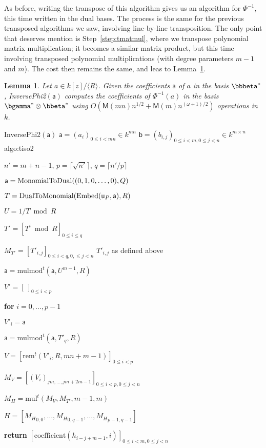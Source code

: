\documentclass{sig-alternate}
\def\M {\ensuremath{\mathsf{M}}}
\def\va {\ensuremath{\mathsf{a}}}
\def\vy {\ensuremath{\mathsf{a}}}
\def\vu {\ensuremath{\mathsf{u}}}
\def\vb {\ensuremath{\mathsf{b}}}
\def\mul {\ensuremath{\mathrm{mul}}}
\def\rem {\ensuremath{\mathrm{rem}}}
\def\coeff {\ensuremath{\mathrm{coefficient}}}
\def\mulmod {\ensuremath{\mathrm{mulmod}}}
\newcounter{algo}
\newenvironment{algorithm_endline}[4]{\small\begin{center}\begin{minipage}{0.48\textwidth}
      \refstepcounter{algo}
      \label{#4}
      \sf
      \rule{\textwidth}{0.2pt}\\
      \makebox[\textwidth][c]{Algorithm~\arabic{algo}:~\textbf{#1}}\\
      \rule[0.5\baselineskip]{\textwidth}{0.2pt}\\

      \vspace{-12pt}

      \parbox{\textwidth}{\textbf{Input} #2}
      \parbox{\textwidth}{\textbf{Output} #3}

\vspace{-7pt}

      \begin{enumerate*}}{\end{enumerate*}
      \vspace{-11pt}
      \rule{\textwidth}{0.2pt}
\end{minipage}\end{center}
}
\newcommand{\ang}[1]{\langle#1\rangle}
\newtheorem{Lemma}{Lemma}
\begin{document}
As before, writing the transpose of this algorithm gives us an
algorithm for $\Phi^{-1}$, this time written in the dual bases.  The
process is the same for the previous transposed algorithms we saw,
involving line-by-line transposition. The only point that deserves
mention is Step~\ref{step:tmatmul}, where we transpose polynomial
matrix multiplication; it becomes a similar matrix product, but this
time involving transposed polynomial multiplications (with degree
parameters $m-1$ and $m$). The cost then remains the same, and leas to
Lemma~\ref{lemma:tiso2}.

\begin{Lemma}\label{lemma:tiso2}
  Let $a\in k[z]/\ang{R}$. Given the coefficients $\va$ of $a$ in the
  basis $\bbbeta^\ast$, {\em InversePhi2}$(\va)$ computes the
  coefficients of $\Phi^{-1}(a)$ in the basis $\bgamma^\ast \otimes
  \bbeta^\ast$ using $O(\M(mn)n^{1/2}+\M(m) n^{(\omega+1)/2} )$
  operations in~$k$.
\end{Lemma}

\begin{algofloat}
  \begin{algorithm_endline}
{InversePhi2$(\va)$}
{$\va = (a_{i})_{0 \le i < mn} \in k^{m n}$}
{$\vb = (b_{i,j})_{0 \le i < m, 0 \le j < n} \in k^{m \times n}$}
{algo:tiso2}
\item $n'=m+n-1$, $p=\lceil \sqrt {n'} \rceil$, $q=\lceil n'/p\rceil$
\item $\vy={\rm MonomialToDual}((0,1,0,\dots,0),Q)$ 
\item $T={\rm DualToMonomial}({\rm Embed}(\vu_P, \vy), R)$
\item $U=1/T \bmod R$
\item $T'=[T^i \bmod R]_{0 \le i \le q}$
\item $M_{T'}=[T'_{i,j}]_{0\le i < q, 0, \le j < n}$ \hfill $T'_{i,j}$ as defined above
\item $\va = \mulmod^t(\va, U^{m-1}, R)$
\item $V'=[\ ]_{0 \le i < p}$
\item {\bf for} {$i=0,\dots,p-1$}
\item \hspace{7mm} $V'_i = \va$
\item \hspace{7mm} $\va = \mulmod^t(\va,T'_q,R)$
\item $V = [\rem^t(V'_i,R,mn+m-1)]_{0 \le i < p}$
\item $M_V = [(V_{i})_{jm,\dots,jm+2m-1}]_{0 \le i < p, 0 \le j < n}$
\item\label{step:tmatmul} $M_H = \mul^t(M_V, M_{T'},m-1,m)$
\item $H=[{M_H}_{0,0},\dots,{M_H}_{0,q-1},\dots,{M_H}_{p-1,q-1}]$
\item {\bf return} $[\coeff(h_{i-j+m-1},i)]_{0 \le i < m, 0 \le j < n}$
  \end{algorithm_endline}
\vspace{-5ex}
\end{algofloat}
\end{document}
